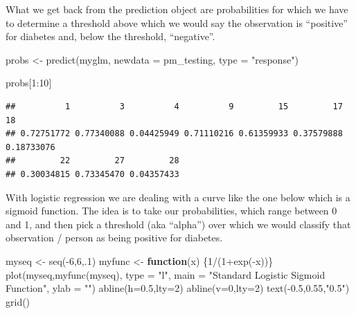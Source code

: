 \documentclass[
]{article}
\newenvironment{Shaded}{\begin{snugshade}}{\end{snugshade}}
\newcommand{\AttributeTok}[1]{\textcolor[rgb]{0.77,0.63,0.00}{#1}}
\newcommand{\ControlFlowTok}[1]{\textcolor[rgb]{0.13,0.29,0.53}{\textbf{#1}}}
\newcommand{\DecValTok}[1]{\textcolor[rgb]{0.00,0.00,0.81}{#1}}
\newcommand{\FloatTok}[1]{\textcolor[rgb]{0.00,0.00,0.81}{#1}}
\newcommand{\FunctionTok}[1]{\textcolor[rgb]{0.00,0.00,0.00}{#1}}
\newcommand{\NormalTok}[1]{#1}
\newcommand{\OtherTok}[1]{\textcolor[rgb]{0.56,0.35,0.01}{#1}}
\newcommand{\SpecialCharTok}[1]{\textcolor[rgb]{0.00,0.00,0.00}{#1}}
\newcommand{\StringTok}[1]{\textcolor[rgb]{0.31,0.60,0.02}{#1}}
\begin{document}
What we get back from the prediction object are probabilities for which
we have to determine a threshold above which we would say the
observation is ``positive'' for diabetes and, below the threshold,
``negative''.

\begin{Shaded}
\begin{Highlighting}[]
\NormalTok{probs }\OtherTok{\textless{}{-}} \FunctionTok{predict}\NormalTok{(myglm,}
                 \AttributeTok{newdata =}\NormalTok{ pm\_testing,}
                 \AttributeTok{type =} \StringTok{"response"}\NormalTok{)}

\NormalTok{probs[}\DecValTok{1}\SpecialCharTok{:}\DecValTok{10}\NormalTok{]}
\end{Highlighting}
\end{Shaded}

\begin{verbatim}
##          1          3          4          9         15         17         18 
## 0.72751772 0.77340088 0.04425949 0.71110216 0.61359933 0.37579888 0.18733076 
##         22         27         28 
## 0.30034815 0.73345470 0.04357433
\end{verbatim}

With logistic regression we are dealing with a curve like the one below
which is a sigmoid function. The idea is to take our probabilities,
which range between 0 and 1, and then pick a threshold (aka ``alpha'')
over which we would classify that observation / person as being positive
for diabetes.

\begin{Shaded}
\begin{Highlighting}[]
\NormalTok{myseq }\OtherTok{\textless{}{-}} \FunctionTok{seq}\NormalTok{(}\SpecialCharTok{{-}}\DecValTok{6}\NormalTok{,}\DecValTok{6}\NormalTok{,.}\DecValTok{1}\NormalTok{)}
\NormalTok{myfunc }\OtherTok{\textless{}{-}} \ControlFlowTok{function}\NormalTok{(x) \{}\DecValTok{1}\SpecialCharTok{/}\NormalTok{(}\DecValTok{1}\SpecialCharTok{+}\FunctionTok{exp}\NormalTok{(}\SpecialCharTok{{-}}\NormalTok{x))\}}
\FunctionTok{plot}\NormalTok{(myseq,}\FunctionTok{myfunc}\NormalTok{(myseq),}
     \AttributeTok{type =} \StringTok{"l"}\NormalTok{,}
     \AttributeTok{main =} \StringTok{"Standard Logistic Sigmoid Function"}\NormalTok{,}
     \AttributeTok{ylab =} \StringTok{""}\NormalTok{)}
\FunctionTok{abline}\NormalTok{(}\AttributeTok{h=}\FloatTok{0.5}\NormalTok{,}\AttributeTok{lty=}\DecValTok{2}\NormalTok{)}
\FunctionTok{abline}\NormalTok{(}\AttributeTok{v=}\DecValTok{0}\NormalTok{,}\AttributeTok{lty=}\DecValTok{2}\NormalTok{)}
\FunctionTok{text}\NormalTok{(}\SpecialCharTok{{-}}\FloatTok{0.5}\NormalTok{,}\FloatTok{0.55}\NormalTok{,}\StringTok{"0.5"}\NormalTok{)}
\FunctionTok{grid}\NormalTok{()}
\end{Highlighting}
\end{Shaded}
\end{document}
